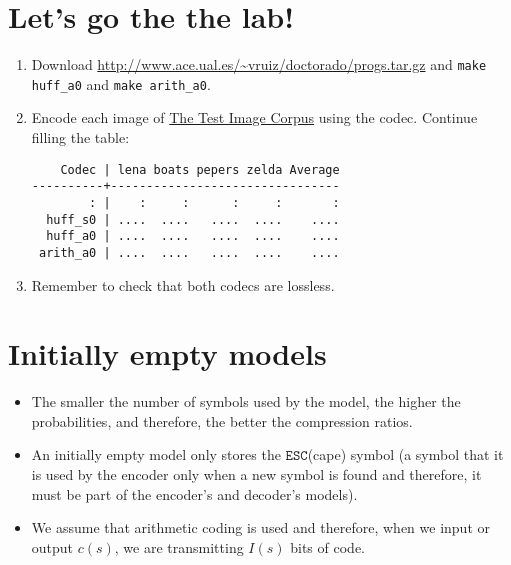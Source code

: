 \section*{Let's go the the lab!}
\begin{enumerate}
\item Download
  \url{http://www.ace.ual.es/~vruiz/doctorado/progs.tar.gz} and
  \texttt{make huff\_a0} and \texttt{make arith\_a0}.
\item Encode each image of
  \href{http://www.ace.ual.es/~vruiz/images/}{The Test Image
    Corpus} using the  codec. Continue filling the table:
\begin{verbatim}
    Codec | lena boats pepers zelda Average
----------+--------------------------------
        : |    :     :      :     :       :
  huff_s0 | ....  ....   ....  ....    ....
  huff_a0 | ....  ....   ....  ....    ....
 arith_a0 | ....  ....   ....  ....    ....
\end{verbatim}
\item Remember to check that both codecs are lossless.
\end{enumerate}

\section{Initially empty models}
\label{modelo_probabilistico_adaptativo_vacio}
\begin{itemize}
\item The smaller the number of symbols used by the model, the higher
  the probabilities, and therefore, the better the compression ratios.
\item An initially empty model only stores the $\mathtt{ESC}$(cape) symbol (a
  symbol that it is used by the encoder only when a new symbol is
  found and therefore, it must be part of the encoder's and decoder's models).
\item We assume that arithmetic coding is used and therefore, when we
  input or output $c(s)$, we are transmitting $I(s)$ bits of code.
\end{itemize}

